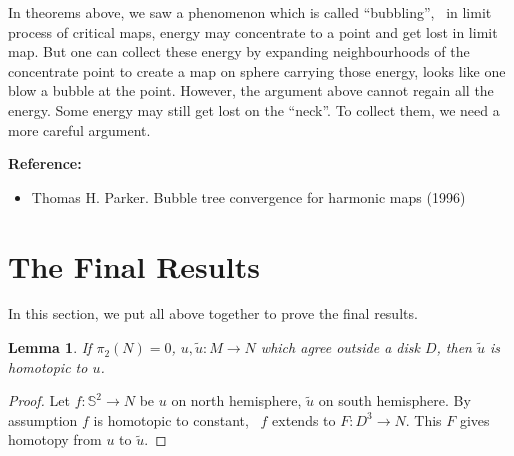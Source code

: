 \documentclass[UTF8,12pt]{article}
\theoremstyle{plain}\newtheorem{theorem}{Theorem}
\theoremstyle{definition}\newtheorem{definition}[theorem]{Definition}
\theoremstyle{definition}\newtheorem{example}[theorem]{Example}
\theoremstyle{plain}\newtheorem{axiom}[theorem]{Axiom}
\theoremstyle{plain}\newtheorem{assertion}[theorem]{Assertion}
\theoremstyle{plain}\newtheorem{corollary}[theorem]{Corollary}
\theoremstyle{plain}\newtheorem{lemma}[theorem]{Lemma}
\theoremstyle{plain}\newtheorem{proposition}[theorem]{Proposition}
\theoremstyle{plain}\newtheorem{prop}[theorem]{Proposition}
\theoremstyle{plain}\newtheorem{conjecture}[theorem]{Conjecture}
\theoremstyle{plain}\newtheorem{conj}[theorem]{Conjecture}
\theoremstyle{plain}\newtheorem{problem}[theorem]{Problem}
\theoremstyle{remark}\newtheorem{notation}[theorem]{Notation}
\theoremstyle{definition}\newtheorem*{question}{Question}
\theoremstyle{definition}\newtheorem*{answer}{Answer}
\theoremstyle{definition}\newtheorem*{goal}{Goal}
\theoremstyle{plain}\newtheorem*{application}{Application}
\theoremstyle{plain}\newtheorem*{exercise}{Exercise}
\theoremstyle{remark}\newtheorem*{remark}{Remark}
\theoremstyle{remark}\newtheorem*{note}{\small{Note}}
\numberwithin{equation}{section}
\numberwithin{theorem}{section}
\numberwithin{figure}{section}
\begin{document}
In theorems above, we saw a phenomenon which is called ``bubbling'', \ie\ in limit
process of critical maps, energy may concentrate to a point and get lost in limit
map. But one can collect these energy by expanding neighbourhoods of the concentrate
point to create a map on sphere carrying those energy, looks like one blow a bubble
at the point. However, the argument above cannot regain all the energy. Some energy
may still get lost on the ``neck''. To collect them, we need a more careful argument.

\noindent\textbf{Reference:}
\begin{itemize}\itshape{}
\item Thomas H. Parker. Bubble tree convergence for harmonic maps (1996)
\end{itemize}

\section{The Final Results}
In this section, we put all above together to prove the final results.

\begin{lemma}
    If \(\pi_2(N)=0\), \(u,\tilde{u}\colon M\to N\) which agree outside a disk \(D\),
    then \(\tilde{u}\) is homotopic to \(u\).
\end{lemma}
\begin{proof}
    Let \(f\colon \mathbb{S}^2\to N\) be \(u\) on north hemisphere, \(\tilde{u}\) on 
    south hemisphere. By assumption \(f\) is homotopic to constant, \ie\ \(f\) extends
    to \(F\colon D^3\to N\). This \(F\) gives homotopy from \(u\) to \(\tilde{u}\).
\end{proof}
\end{document}
